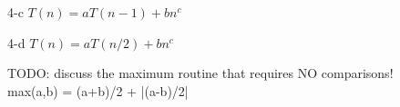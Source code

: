 \documentclass[11pt]{article}
\begin{document}
\begin{prob}{4-c}
$T(n) = aT(n-1) + bn^{c}$
\end{prob}
\begin{sol} 


\end{sol}

\begin{prob}{4-d}
$T(n) = aT(n/2) + bn^{c}$
\end{prob}
\begin{sol} 


\end{sol}

\begin{prob}{5}
\end{prob}
\begin{sol} 

TODO: discuss the maximum routine that requires NO comparisons! \\
max(a,b) = (a+b)/2 + |(a-b)/2|

\end{sol}

\end{document}
